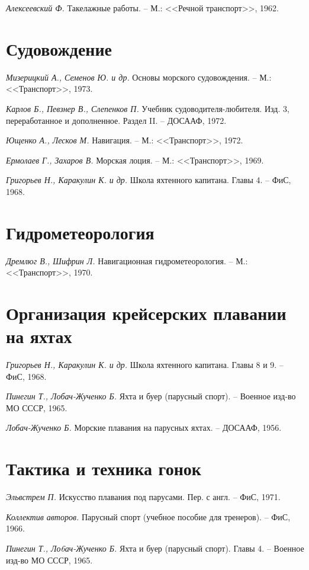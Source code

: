 \documentclass[a4paper, 12pt, twoside, final]{scrbook}
\begin{document}
\textit{Алексеевский Ф.} Такелажные работы. \--- М.: <<Речной транспорт>>, 1962.

\section*{Судовождение}

\textit{Мизерицкий А., Семенов  Ю. и др.} Основы морского судовождения. \--- М.: <<Транспорт>>, 1973.

\textit{Карлов Б., Певзнер В., Слепенков П.} Учебник судоводителя-любителя. Изд. 3, переработанное и дополненное. Раздел II. \--- ДОСААФ, 1972.

\textit{Ющенко А., Лесков М.} Навигация. \--- М.: <<Транспорт>>, 1972.

\textit{Ермолаев Г., Захаров В.} Морская лоция. \--- М.: <<Транспорт>>, 1969.

\textit{Григорьев Н., Каракулин К. и др.} Школа яхтенного капитана. Главы 4.  \--- ФиС, 1968.

\section*{Гидрометеорология}

\textit{Дремлюг В., Шифрин Л.} Навигационная   гидрометеорология. \---  М.: <<Транспорт>>, 1970.

\section*{Организация крейсерских плавании на яхтах}

\textit{Григорьев Н., Каракулин К. и др.} Школа яхтенного капитана. Главы 8 и 9.  \--- ФиС, 1968.

\textit{Пинегин Т., Лобач-Жученко Б.} Яхта и буер (парусный спорт). \--- Военное изд-во МО СССР, 1965.

\textit{Лобач-Жученко Б.} Морские плавания на парусных яхтах. \--- ДОСААФ, 1956.

\section*{Тактика и техника гонок}

\textit{Эльвстрем П.} Искусство плавания под парусами. Пер. с англ. \--- ФиС, 1971.

\textit{Коллектив авторов.}  Парусный спорт (учебное пособие для тренеров). \--- ФиС, 1966.

\textit{Пинегин Т., Ло6ач-Жученко Б.} Яхта и буер (парусный спорт). Главы 4. \--- Военное изд-во МО СССР, 1965.
\end{document}
